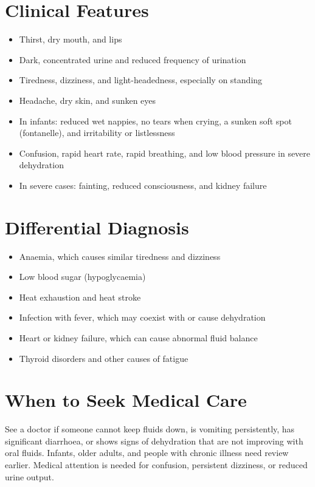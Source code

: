 \section*{Clinical Features}
\begin{itemize}
    \item Thirst, dry mouth, and lips
    \item Dark, concentrated urine and reduced frequency of urination
    \item Tiredness, dizziness, and light-headedness, especially on standing
    \item Headache, dry skin, and sunken eyes
    \item In infants: reduced wet nappies, no tears when crying, a sunken soft spot (fontanelle), and irritability or listlessness
    \item Confusion, rapid heart rate, rapid breathing, and low blood pressure in severe dehydration
    \item In severe cases: fainting, reduced consciousness, and kidney failure
\end{itemize}

\section*{Differential Diagnosis}
\begin{itemize}
    \item Anaemia, which causes similar tiredness and dizziness
    \item Low blood sugar (hypoglycaemia)
    \item Heat exhaustion and heat stroke
    \item Infection with fever, which may coexist with or cause dehydration
    \item Heart or kidney failure, which can cause abnormal fluid balance
    \item Thyroid disorders and other causes of fatigue
\end{itemize}

\section*{When to Seek Medical Care}
See a doctor if someone cannot keep fluids down, is vomiting persistently, has significant diarrhoea, or shows signs of dehydration that are not improving with oral fluids. Infants, older adults, and people with chronic illness need review earlier. Medical attention is needed for confusion, persistent dizziness, or reduced urine output.

